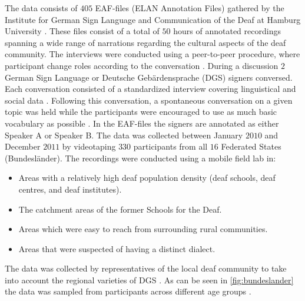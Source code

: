 The data consists of $405$ EAF-files (ELAN Annotation Files) gathered by the Institute for German Sign Language and Communication of the Deaf at Hamburg University \cite{prillwitz2008dgs}. These files consist of a total of $50$ hours of annotated recordings spanning a wide range of narrations regarding the cultural aspects of the deaf community. The interviews were conducted using a peer-to-peer procedure, where participant change roles according to the conversation \cite{prillwitz2008dgs}. During a discussion $2$ German Sign Language or Deutsche Gebärdensprache (DGS) signers conversed. Each conversation consisted of a standardized interview covering linguistical and social data \cite{deaf_areas}. Following this conversation, a spontaneous conversation on a given topic was held while the participants were encouraged to use as much basic vocabulary as possible \cite{deaf_areas}. In the EAF-files the signers are annotated as either Speaker A or Speaker B. The data was collected between January $2010$ and December $2011$  by videotaping $330$ participants from all $16$ Federated States (Bundesländer). The recordings were conducted using a mobile field lab in:

\begin{itemize}
  \item Areas with a relatively high deaf population density (deaf schools, deaf centres, and deaf institutes). \cite{age_data_hamburg} \cite{deaf_areas}
  \item The catchment areas of the former Schools for the Deaf.\cite{age_data_hamburg} \cite{prillwitz2008dgs}
  \item Areas which were easy to reach from surrounding rural communities. \cite{age_data_hamburg} \cite{deaf_areas}
  \item Areas that were suspected of having a distinct dialect. \cite{age_data_hamburg} \cite{prillwitz2008dgs}
\end{itemize}

 The data was collected by representatives of the local deaf community to take into account the regional varieties of DGS \cite{deaf_areas}. As can be seen in \autoref{fig:bundeslander} the data was sampled from participants across different age groups \cite{age_data_hamburg}. 


\mydata

